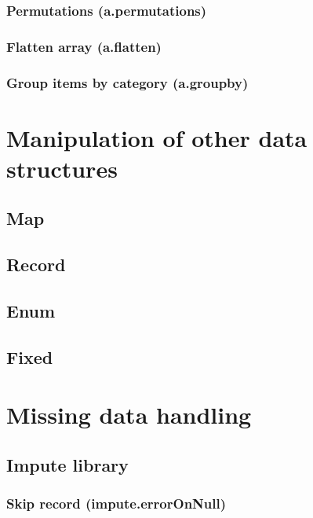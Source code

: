 \documentclass{article}
\theoremstyle{definition}
\begin{document}
\subsubsection{Permutations (a.permutations)}

\subsubsection{Flatten array (a.flatten)}

\subsubsection{Group items by category (a.groupby)}

\pagebreak

\section{Manipulation of other data structures}

\subsection{Map}

\subsection{Record}

\subsection{Enum}

\subsection{Fixed}

\pagebreak

\section{Missing data handling}

\hypertarget{hsec:impute}{}
\subsection{Impute library}
\label{sec:impute}

\subsubsection{Skip record (impute.errorOnNull)}
\end{document}
